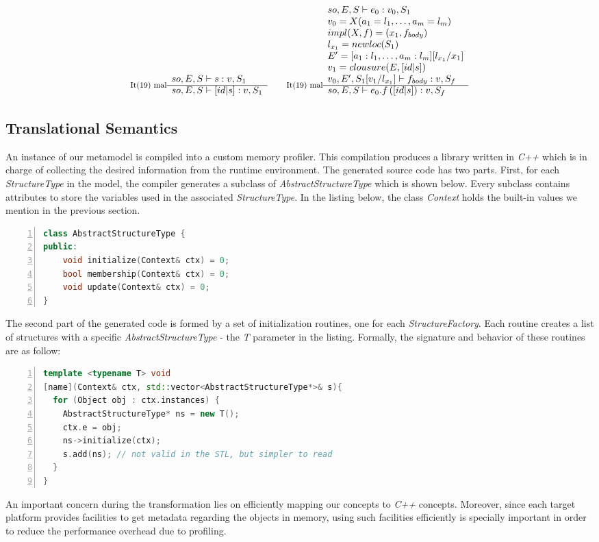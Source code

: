 
\[
\inference[It(19) mal]{
so,E,S|-s:v,S_1
}{
so,E,S|-[id|s]:v,S_1
}
\quad\quad
\inference[It(19) mal]{
so,E,S|-e_0:v_0,S_1 \\
v_0 = X(a_1=l_1, \dots, a_m=l_m) \\
impl(X,f) = (x_1, f_{body}) \\
l_{x_1} = newloc(S_1) \\
E' = [a_1:l_1, \dots, a_m:l_m][l_{x_1}/x_1] \\
v_1 = clousure(E, \left[ id | s \right]) \\
v_0, E', S_1[v_1/l_{x_1}]|-f_{body}:v,S_f 
}{
so,E,S|-e_0.f\left( \left[ id | s \right] \right):v,S_f
}
\]

\subsection{Translational Semantics}\label{sec:semantic}

An instance of our metamodel is compiled into a custom memory profiler.
This compilation produces a library written in \textit{C++} which is in charge of collecting the desired information from the runtime environment.
The generated source code has two parts.
First, for each \textit{StructureType} in the model, the compiler generates a subclass of \textit{AbstractStructureType} which is shown below.
Every subclass contains attributes to store the variables used in the associated \textit{StructureType}.
In the listing below, the class \textit{Context} holds the built-in values we mention in the previous section.
\begin{lstlisting}[language=C++, frame=tblr,
numbers=left,
numberstyle=\color{black}\scriptsize,]
class AbstractStructureType {
public:
	void initialize(Context& ctx) = 0;
	bool membership(Context& ctx) = 0;
	void update(Context& ctx) = 0;
}
\end{lstlisting}

The second part of the generated code is formed by a set of initialization routines, one for each \textit{StructureFactory}.
Each routine creates a list of structures with a specific \textit{AbstractStructureType} - the \textit{T} parameter in the listing.
Formally, the signature and behavior of these routines are as follow:
\begin{lstlisting}[language=C++, frame=tblr,
numbers=left,
numberstyle=\color{black}\scriptsize,]
template <typename T> void
[name](Context& ctx, std::vector<AbstractStructureType*>& s){
  for (Object obj : ctx.instances) {
    AbstractStructureType* ns = new T();
    ctx.e = obj;
    ns->initialize(ctx);
    s.add(ns); // not valid in the STL, but simpler to read
  }
}
\end{lstlisting}
An important concern during the transformation lies on efficiently mapping our concepts to \textit{C++} concepts.
Moreover, since each target platform provides facilities to get metadata regarding the objects in memory, using such facilities efficiently is specially important in order to reduce the performance overhead due to profiling.

